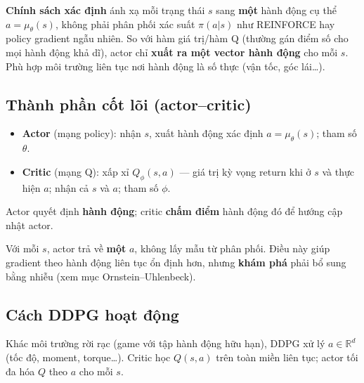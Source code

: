 \begin{dinhnghia}[title={``Deterministic'' trong DDPG}]
\textbf{Chính sách xác định} ánh xạ mỗi trạng thái $s$ sang \textbf{một} hành động cụ thể $a = \mu_\theta(s)$, không phải phân phối xác suất $\pi(a|s)$ như REINFORCE hay policy gradient ngẫu nhiên. So với hàm giá trị/hàm Q (thường gán điểm số cho mọi hành động khả dĩ), actor chỉ \textbf{xuất ra một vector hành động} cho mỗi $s$. Phù hợp môi trường liên tục nơi hành động là số thực (vận tốc, góc lái\ldots).
\end{dinhnghia}

\subsection{Thành phần cốt lõi (actor--critic)}

\begin{dinhnghia}[title={Kiến trúc Actor--Critic}]
\begin{itemize}
  \item \textbf{Actor} (mạng policy): nhận $s$, xuất hành động xác định $a = \mu_\theta(s)$; tham số $\theta$.
  \item \textbf{Critic} (mạng Q): xấp xỉ $Q_\phi(s,a)$ --- giá trị kỳ vọng return khi ở $s$ và thực hiện $a$; nhận cả $s$ và $a$; tham số $\phi$.
\end{itemize}
Actor quyết định \textbf{hành động}; critic \textbf{chấm điểm} hành động đó để hướng cập nhật actor.
\end{dinhnghia}

\begin{tinhchat}[title={Policy xác định so với policy ngẫu nhiên}]
Với mỗi $s$, actor trả về \textbf{một} $a$, không lấy mẫu từ phân phối. Điều này giúp gradient theo hành động liên tục ổn định hơn, nhưng \textbf{khám phá} phải bổ sung bằng nhiễu (xem mục Ornstein--Uhlenbeck).
\end{tinhchat}

\subsection{Cách DDPG hoạt động}

\begin{phuongphap}[title={Không gian hành động liên tục}]
Khác môi trường rời rạc (game với tập hành động hữu hạn), DDPG xử lý $a \in \mathbb{R}^d$ (tốc độ, moment, torque\ldots). Critic học $Q(s,a)$ trên toàn miền liên tục; actor tối đa hóa $Q$ theo $a$ cho mỗi $s$.
\end{phuongphap}

